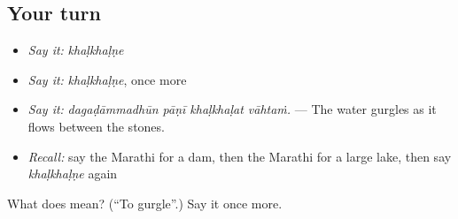 \subsection*{Your turn}
\begin{itemize}
\raggedright
  \item \emph{Say it:} \emph{khaḷkhaḷṇe}
  \item \emph{Say it:} \emph{khaḷkhaḷṇe}, once more
  \item \emph{Say it:} \emph{dagaḍāmmadhūn pāṇī khaḷkhaḷat vāhtaṁ.} — The water gurgles as it flows between the stones.
  \item \emph{Recall:} say the Marathi for a dam, then the Marathi for a large lake, then say \emph{khaḷkhaḷṇe} again
\end{itemize}

\begin{tcolorbox}[breakable,colback=teal!4,colframe=teal!35!black,title={Before you move on}]
What does  mean? (\textquotedblleft{}To gurgle\textquotedblright{}.) Say it once more.
\end{tcolorbox}
